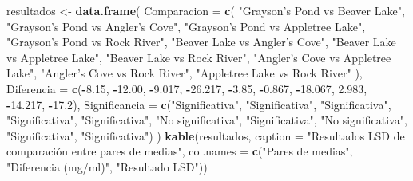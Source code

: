 \documentclass[
]{article}
\newenvironment{Shaded}{\begin{snugshade}}{\end{snugshade}}
\newcommand{\AttributeTok}[1]{\textcolor[rgb]{0.13,0.29,0.53}{#1}}
\newcommand{\FloatTok}[1]{\textcolor[rgb]{0.00,0.00,0.81}{#1}}
\newcommand{\FunctionTok}[1]{\textcolor[rgb]{0.13,0.29,0.53}{\textbf{#1}}}
\newcommand{\NormalTok}[1]{#1}
\newcommand{\OtherTok}[1]{\textcolor[rgb]{0.56,0.35,0.01}{#1}}
\newcommand{\SpecialCharTok}[1]{\textcolor[rgb]{0.81,0.36,0.00}{\textbf{#1}}}
\newcommand{\StringTok}[1]{\textcolor[rgb]{0.31,0.60,0.02}{#1}}
\begin{document}
\begin{Shaded}
\begin{Highlighting}[]
\NormalTok{resultados }\OtherTok{\textless{}{-}} \FunctionTok{data.frame}\NormalTok{(}
  \AttributeTok{Comparacion =} \FunctionTok{c}\NormalTok{(}
    \StringTok{"Grayson’s Pond vs Beaver Lake"}\NormalTok{,}
    \StringTok{"Grayson’s Pond vs Angler’s Cove"}\NormalTok{,}
    \StringTok{"Grayson’s Pond vs Appletree Lake"}\NormalTok{,}
    \StringTok{"Grayson’s Pond vs Rock River"}\NormalTok{,}
    \StringTok{"Beaver Lake vs Angler’s Cove"}\NormalTok{,}
    \StringTok{"Beaver Lake vs Appletree Lake"}\NormalTok{,}
    \StringTok{"Beaver Lake vs Rock River"}\NormalTok{,}
    \StringTok{"Angler’s Cove vs Appletree Lake"}\NormalTok{,}
    \StringTok{"Angler’s Cove vs Rock River"}\NormalTok{,}
    \StringTok{"Appletree Lake vs Rock River"}
\NormalTok{  ),}
  \AttributeTok{Diferencia =} \FunctionTok{c}\NormalTok{(}\SpecialCharTok{{-}}\FloatTok{8.15}\NormalTok{, }\SpecialCharTok{{-}}\FloatTok{12.00}\NormalTok{, }\SpecialCharTok{{-}}\FloatTok{9.017}\NormalTok{, }\SpecialCharTok{{-}}\FloatTok{26.217}\NormalTok{, }\SpecialCharTok{{-}}\FloatTok{3.85}\NormalTok{, }\SpecialCharTok{{-}}\FloatTok{0.867}\NormalTok{, }\SpecialCharTok{{-}}\FloatTok{18.067}\NormalTok{, }\FloatTok{2.983}\NormalTok{, }\SpecialCharTok{{-}}\FloatTok{14.217}\NormalTok{, }\SpecialCharTok{{-}}\FloatTok{17.2}\NormalTok{),}
  \AttributeTok{Significancia =} \FunctionTok{c}\NormalTok{(}\StringTok{"Significativa"}\NormalTok{, }\StringTok{"Significativa"}\NormalTok{, }\StringTok{"Significativa"}\NormalTok{, }\StringTok{"Significativa"}\NormalTok{,}
                    \StringTok{"Significativa"}\NormalTok{, }\StringTok{"No significativa"}\NormalTok{, }\StringTok{"Significativa"}\NormalTok{,}
                    \StringTok{"No significativa"}\NormalTok{, }\StringTok{"Significativa"}\NormalTok{, }\StringTok{"Significativa"}\NormalTok{)}
\NormalTok{)}
\FunctionTok{kable}\NormalTok{(resultados, }\AttributeTok{caption =} \StringTok{"Resultados LSD de comparación entre pares de medias"}\NormalTok{,}
      \AttributeTok{col.names =} \FunctionTok{c}\NormalTok{(}\StringTok{"Pares de medias"}\NormalTok{, }\StringTok{"Diferencia (mg/ml)"}\NormalTok{, }\StringTok{"Resultado LSD"}\NormalTok{))}
\end{Highlighting}
\end{Shaded}
\end{document}
